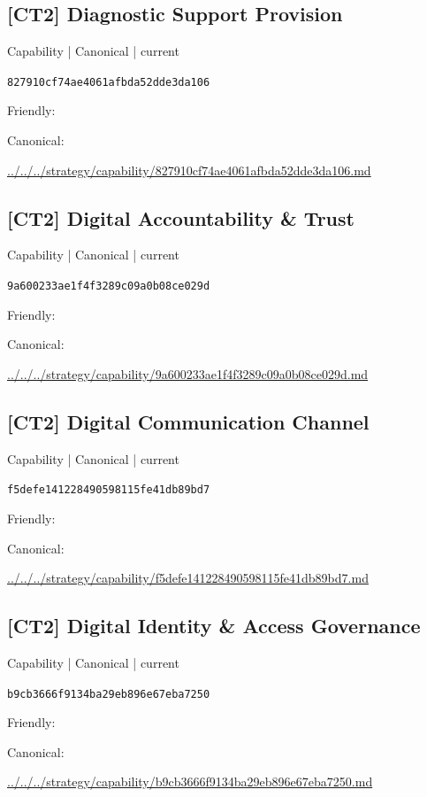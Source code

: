 \documentclass[10pt,a4paper]{article}
\begin{document}
\subsection*{[CT2] Diagnostic Support Provision}
{\small Capability | Canonical | current}\par
\texttt{827910cf74ae4061afbda52dde3da106}\par
Friendly: \par
Canonical: \par
{\footnotesize\url{../../../strategy/capability/827910cf74ae4061afbda52dde3da106.md}}\par
\subsection*{[CT2] Digital Accountability \& Trust}
{\small Capability | Canonical | current}\par
\texttt{9a600233ae1f4f3289c09a0b08ce029d}\par
Friendly: \par
Canonical: \par
{\footnotesize\url{../../../strategy/capability/9a600233ae1f4f3289c09a0b08ce029d.md}}\par
\subsection*{[CT2] Digital Communication Channel}
{\small Capability | Canonical | current}\par
\texttt{f5defe141228490598115fe41db89bd7}\par
Friendly: \par
Canonical: \par
{\footnotesize\url{../../../strategy/capability/f5defe141228490598115fe41db89bd7.md}}\par
\subsection*{[CT2] Digital Identity \& Access Governance}
{\small Capability | Canonical | current}\par
\texttt{b9cb3666f9134ba29eb896e67eba7250}\par
Friendly: \par
Canonical: \par
{\footnotesize\url{../../../strategy/capability/b9cb3666f9134ba29eb896e67eba7250.md}}\par
\end{document}
